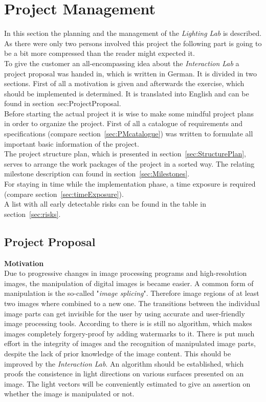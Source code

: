 \section{Project Management} \label{sec:pm}
In this section the planning and the management of the \textit{Lighting Lab} is described. As there were only two persons involved this project the following part is going to be a bit more compressed than the reader might expected it.\\
To give the customer an all-encompassing idea about the \textit{Interaction Lab} a project proposal was handed in, which is written in German. It is divided in two sections. First of all a motivation is given and afterwards the exercise, which should be implemented is determined. It is translated into English and can be found in section~{sec:ProjectProposal}. \\ 
Before starting the actual project it is wise to make some mindful project plans in order to organize the project. First of all a catalogue of requirements and specifications (compare section~\ref{sec:PMcatalogue}) was written to formulate all important basic information of the project. \\
The project structure plan, which is presented in section~\ref{sec:StructurePlan}, serves to arrange the work packages of the project in a sorted way. The relating milestone description can found in section~\ref{sec:Milestones}. \\
For staying in time while the implementation phase, a time exposure is required (compare section~\ref{sec:timeExposure}).\\
A list with all early detectable risks can be found in the table in section~\ref{sec:risks}.


\subsection{Project Proposal}\label{sec:ProjectProposal}

\textbf{Motivation} \\
Due to progressive changes in image processing programs and high-resolution images, the manipulation of digital images is became easier. A common form of manipulation is the so-called "\textit{image splicing}". Therefore image regions of at least two images where combined to a new one. The transitions between the individual image parts can get invisible for the user by using accurate and user-friendly image processing tools.
According to \cite{Hsu2006DetectingIS} there is is still no algorithm, which makes images completely forgery-proof by adding watermarks to it. There is put much effort in the integrity of images and the recognition of manipulated image parts, despite the lack of prior knowledge of the image content. This should be improved by the \textit{Interaction Lab}. An algorithm should be established, which proofs the consistence in light directions on various surfaces presented on an image. The light vectors will be conveniently estimated to give an assertion on whether the image is manipulated or not.\\

